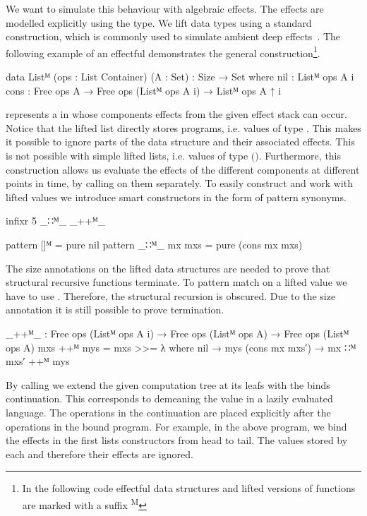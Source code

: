 We want to simulate this behaviour with algebraic effects.
The effects are modelled explicitly using the  type.
We lift data types using a standard construction, which is commonly used
to simulate ambient deep
effects~\cite{DBLP:conf/haskell/AbelBBHN05, DBLP:journals/programming/DylusCT19,
DBLP:conf/haskell/ChristiansenDB19}.
The following example of an effectful  demonstrates
the general construction\footnote{In the following code effectful data
  structures and lifted versions of functions are marked with a suffix
  \textsuperscript{M}}.

\begin{code}
data Listᴹ (ops : List Container) (A : Set) : {Size} → Set where
  nil   : Listᴹ ops A {i}
  cons  : Free ops A → Free ops (Listᴹ ops A {i}) → Listᴹ ops A {↑ i}
\end{code}
\AgdaSpace{}\AgdaSpace{}
represents a \AgdaSpace{} in whose components
effects from the given effect stack  can occur.
Notice that the lifted list directly stores programs, i.e. values of type
\AgdaSpace{}\AgdaSpace{}.
This makes it possible to ignore parts of the data structure and their
associated effects.
This is not possible with simple lifted lists, i.e. values of type
\AgdaSpace{}\AgdaSpace{}$($\AgdaSpace{}$)$.
Furthermore, this construction allows us evaluate the effects of the different
components at different points in time, by calling \AgdaFunction{>>=} on them
separately. 
To easily construct and work with lifted values we introduce smart constructors
in the form of pattern synonyms.

\begin{code}[hide]
infixr 5 _∷ᴹ_ _++ᴹ_
\end{code}
\begin{code}
pattern []ᴹ          = pure nil
pattern _∷ᴹ_ mx mxs  = pure (cons mx mxs)
\end{code}
The size annotations on the lifted data structures are needed to prove
that structural recursive functions terminate.
To pattern match on a lifted value we have to use \AgdaFunction{>>=}.
Therefore, the structural recursion is obscured.
Due to the size annotation it is still possible to prove termination.

\begin{code}
_++ᴹ_ : Free ops (Listᴹ ops A {i}) → Free ops (Listᴹ ops A) → Free ops (Listᴹ ops A)
mxs ++ᴹ mys = mxs >>= λ where
  nil             → mys
  (cons mx mxs′)  → mx ∷ᴹ mxs′ ++ᴹ mys
\end{code}
By calling \AgdaFunction{>>=} we extend the given computation tree at its leafs
with the binds continuation.
This corresponds to demeaning the value in a lazily evaluated language.
The operations in the continuation are placed explicitly after the operations in
the bound program.
For example, in the above program, we bind the effects in the first lists
constructors from head to tail.
The values stored by each  and therefore their
effects are ignored.



